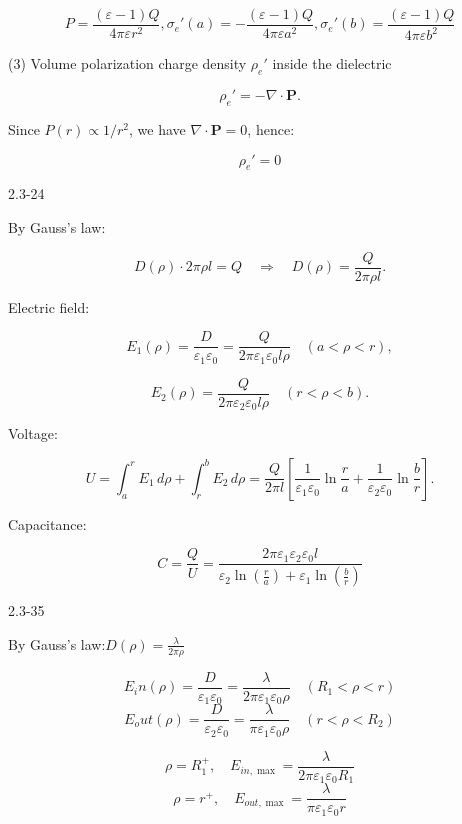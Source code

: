 \documentclass{article}
\begin{document}
$$P=\frac{\left(\varepsilon-1\right)Q}{4\pi\varepsilon r^{2}},\sigma_{e}'(a)=-\frac{\left(\varepsilon-1\right)Q}{4\pi\varepsilon a^{2}},\sigma_{e}'(b)=\frac{\left(\varepsilon-1\right)Q}{4\pi\varepsilon b^{2}}$$

\vspace{2em}

(3) Volume polarization charge density $ \rho_e' $ inside the dielectric

$$\rho_e' = -\nabla \cdot \mathbf{P}.$$

Since $ P(r) \propto 1/r^2 $, we have $ \nabla \cdot \mathbf{P} = 0 $, hence:

$$\rho_e' = 0$$






\newpage

2.3-24

By Gauss’s law:

$$D(\rho) \cdot 2\pi\rho l = Q \quad \Rightarrow \quad D(\rho) = \frac{Q}{2\pi\rho l}.$$

Electric field:

$$E_1(\rho) = \frac{D}{\varepsilon_1\varepsilon_0} = \frac{Q}{2\pi\varepsilon_1\varepsilon_0 l \rho} \quad (a < \rho < r),$$

$$E_2(\rho) = \frac{Q}{2\pi\varepsilon_2\varepsilon_0 l \rho} \quad (r < \rho < b).$$

Voltage:

$$U = \int_a^r E_1 \, d\rho + \int_r^b E_2 \, d\rho= \frac{Q}{2\pi l} \left[ \frac{1}{\varepsilon_1\varepsilon_0} \ln\frac{r}{a} + \frac{1}{\varepsilon_2\varepsilon_0} \ln\frac{b}{r} \right].$$

Capacitance:

$$C = \frac{Q}{U} = \frac{2\pi\varepsilon_1\varepsilon_2\varepsilon_0l}{\varepsilon_2\ln(\frac{r}{a})+\varepsilon_1\ln(\frac{b}{r})}$$


\newpage

2.3-35


By Gauss’s law:$D(\rho) = \frac{\lambda}{2\pi\rho}$

$$E_in(\rho) = \frac{D}{\varepsilon_1\varepsilon_0} = \frac{\lambda}{2\pi\varepsilon_1\varepsilon_0 \rho} \quad (R_1 < \rho < r)$$ 
$$E_out(\rho) = \frac{D}{\varepsilon_2\varepsilon_0} = \frac{\lambda}{\pi\varepsilon_1\varepsilon_0 \rho} \quad (r < \rho < R_2)$$

$$\rho = R_1^+ ,\quad E_{in,\max} = \frac{\lambda}{2\pi\varepsilon_1\varepsilon_0 R_1}$$
$$\rho = r^+ ,\quad E_{out,\max} = \frac{\lambda}{\pi\varepsilon_1\varepsilon_0 r}$$
\end{document}
